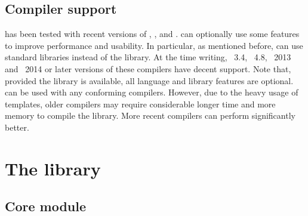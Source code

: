 \documentclass[11pt, fontset=Minion, showoverfull,
bib, mintcode, minted=cache]{marticle}
\begin{document}
\subsection{Compiler support}

\vsmc has been tested with recent versions of \fclang, \fgcc, \ficpc and
\fmsvc. \vsmc can optionally use some \cppoo features to improve performance
and usability. In particular, as mentioned before, \vsmc can use \cppoo
standard libraries instead of the \lboost library. At the time writing,
\lclang~3.4, \lgcc~4.8, \lmsvc~2013 and \licpc~2014 or later versions of these
compilers have decent \cppoo support. Note that, provided the \lboost library
is available, all \cppoo language and library features are optional.  \vsmc
can be used with any \cppne conforming compilers. However, due to the heavy
usage of templates, older compilers may require considerable longer time and
more memory to compile the library. More recent compilers can perform
significantly better.

\section[The vSMC library]{The \protect\vsmc library}
\label{sec:The vSMC library}

\subsection{Core module}
\label{sub:Core module}
\end{document}
